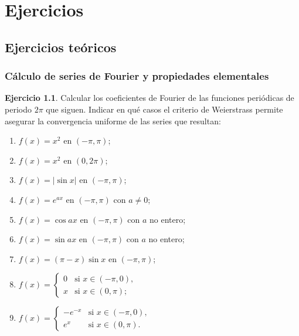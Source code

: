 \documentclass[12pt, a4paper]{amsbook}
\theoremstyle{remark}
\theoremstyle{definition}
\newtheorem{ejer}[teo]{Ejercicio}
\numberwithin{section}{chapter}
\numberwithin{subsection}{section}
\numberwithin{equation}{section}
\numberwithin{figure}{chapter}
\begin{document}
\chapter{Ejercicios}
\section{Ejercicios teóricos}



\subsection*{Cálculo de series de Fourier y propiedades elementales}

\begin{ejer} \label{ejemplos}
Calcular los coeficientes de Fourier de las funciones periódicas de periodo $2\pi$ que siguen. Indicar en qué casos el criterio de Weierstrass permite asegurar la convergencia uniforme de las series que resultan:
\begin{enumerate}
\item $f(x)=x^2$ en $(-\pi,\pi)$;
 
\item $f(x)=x^2$ en $(0,2\pi)$;

\item $f(x) = |\sin x|$ en $(-\pi,\pi)$;

\item $f(x) = e^{ax}$ en $(-\pi,\pi)$ con $a\neq 0$;

\item $f(x) = \cos ax$ en $(-\pi,\pi)$ con $a$ no entero; 

\item $f(x) = \sin ax$ en $(-\pi,\pi)$ con $a$ no entero;

\item $f(x) = (\pi-x)\sin x$ en $(-\pi,\pi)$;

\item $f(x) =\begin{cases}
0 & \text{si } x \in (-\pi,0),\\ 
x & \text{si } x\in (0,\pi);
\end{cases}$

\item $f(x) = \begin{cases}
-e^{-x} & \text{si } x\in (-\pi, 0),\\
e^x & \text{si } x\in (0,\pi).
\end{cases}$
\end{enumerate}
\end{ejer}
\end{document}
